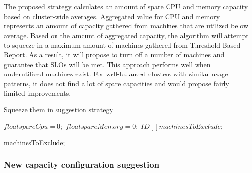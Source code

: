\documentclass[]{final_report}
\begin{document}
The proposed strategy calculates an amount of spare CPU and memory capacity based on cluster-wide averages. Aggregated value for CPU and memory represents an amount of capacity gathered from machines that are utilized below average. Based on the amount of aggregated capacity, the algorithm will attempt to squeeze in a maximum amount of machines gathered from Threshold Based Report. As a result, it will propose to turn off a number of machines and guarantee that SLOs will be met.
This approach performs well when underutilized machines exist. For well-balanced clusters with similar usage patterns, it does not find a lot of spare capacities and would propose fairly limited improvements. 

\begin{algorithm}[h]
\caption{Squeeze them in suggestion strategy}
\label{alg:squeeze-them-in}
 \algrenewcommand{}
 \algrenewcommand{}

  $float spareCpu = 0;$
  $float spareMemory = 0;$
  $ID[ ] machinesToExclude;$



\Return machinesToExclude;

\end{algorithm}

\subsubsection{New capacity configuration suggestion}
\end{document}
